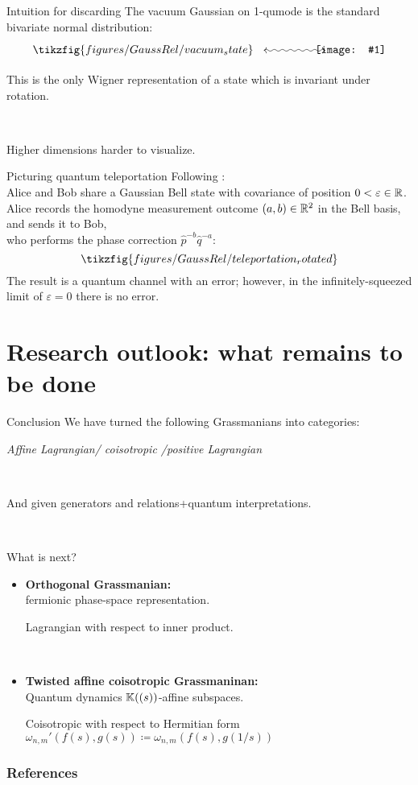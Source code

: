 \documentclass{beamer}
\newcommand{\vcenteredinclude}[1]{\begingroup
\setbox0=\hbox{\texttt{[image: \#1]}}%
\parbox{\wd0}{\box0}\endgroup}
\begin{document}
\begin{frame}{Intuition for discarding}
The vacuum Gaussian on 1-qumode is the standard bivariate normal distribution:
\[
\xymatrix{
\tikzfig{figures/GaussRel/vacuum_state} \ \ \ar@{<~>}[rr]&&
\mbox{\!\!\!\!\!\!\!\vcenteredinclude{scripts/vacuum.png}}
}
\]


This is the only Wigner representation of a state which is invariant under rotation. 


\

Higher dimensions harder to visualize.
\end{frame}

\begin{frame}{Picturing quantum teleportation}
Following \cite{braunstein_teleportation_1998}:\\
Alice and Bob share a Gaussian Bell state with covariance of position $0<\varepsilon \in \mathbb{R}$.\\
Alice records the homodyne measurement outcome \((a,b)\in\mathbb{R}^2\) in the Bell basis, and sends it to Bob,\\ who performs the phase correction \({\hat p}^{- b} {\hat q}^{- a} \):
\[
\tikzfig{figures/GaussRel/teleportation_rotated}
\]
The result is a quantum channel with an error; however, in the infinitely-squeezed limit of \(\varepsilon=0\) there is no error.
\end{frame}



\section{Research outlook: what remains to be done}



\begin{frame}{Conclusion}
We have turned the following Grassmanians into categories:

\emph{Affine Lagrangian/ coisotropic /positive Lagrangian}

\

And given generators and relations+quantum interpretations.


\

What is next?
\begin{itemize}
\item \textbf{Orthogonal Grassmanian:} \\
fermionic phase-space representation.

Lagrangian with respect to inner product.

\

\item \textbf{Twisted affine coisotropic Grassmaninan:} \\ Quantum dynamics \(\mathbb{K}((s))\)-affine subspaces.

Coisotropic with respect to Hermitian form \(\omega_{n,m}'(f(s), g(s)) \coloneqq \omega_{n,m}(f(s), g(1/s))\)

\end{itemize}

\end{frame}


\begin{frame}[allowframebreaks]
        \frametitle{References}
        
\end{frame}
\end{document}
